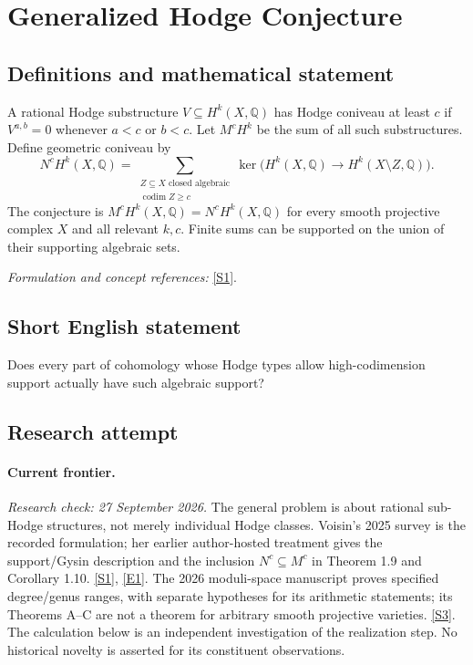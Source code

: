\documentclass[11pt,a4paper]{article}
\newcommand{\Q}{\mathbb{Q}}
\newcommand{\sref}[2]{\hyperlink{source:#1:#2}{[S#2]}}
\newcommand{\eref}[2]{\hyperlink{extra:#1:#2}{[E#2]}}
\newif\ifshowcatalogue
\newcommand{\cataloguescope}[1]{\ifshowcatalogue
 \paragraph{Exact scope in the supplied catalogue.}
 \begin{quote}\small #1\end{quote}\fi}
\begin{document}
\setcounter{section}{0}
\clearpage
\section*{\texorpdfstring{Generalized Hodge Conjecture}{Generalized Hodge Conjecture}}\label{statement}
\subsection{Definitions and mathematical statement}
A rational Hodge substructure $V\subseteq H^k(X,\Q)$ has Hodge coniveau at least $c$ if $V^{a,b}=0$ whenever $a<c$ or $b<c$. Let $M^cH^k$ be the sum of all such substructures. Define geometric coniveau by
\[
 N^cH^k(X,\Q)=\sum_{\substack{Z\subseteq X\text{ closed algebraic}\\ \operatorname{codim}Z\ge c}}
 \ker\bigl(H^k(X,\Q)\to H^k(X\setminus Z,\Q)\bigr).
\]
The conjecture is $M^cH^k(X,\Q)=N^cH^k(X,\Q)$ for every smooth projective complex $X$ and all relevant $k,c$. Finite sums can be supported on the union of their supporting algebraic sets.
\par\smallskip\textit{Formulation and concept references:} \sref{statement}{1}.
\cataloguescope{For every smooth projective complex variety X and integers k,c, prove that the largest rational Hodge substructure of H\textasciicircum{}k(X,Q) with Hodge coniveau at least c equals the subspace of classes that vanish on X minus some closed algebraic subset of codimension at least c.}
\subsection{Short English statement}
Does every part of cohomology whose Hodge types allow high-codimension support actually have such algebraic support?
\subsection{Research attempt}
\paragraph{Current frontier.}
\textit{Research check: 27 September 2026.}
The general problem is about rational sub-Hodge structures, not merely
individual Hodge classes. Voisin's 2025 survey is the recorded formulation;
her earlier author-hosted treatment gives the support/Gysin description and
the inclusion $N^c\subseteq M^c$ in Theorem 1.9 and Corollary 1.10.
\sref{statement}{1}, \eref{statement}{1}.
The 2026 moduli-space manuscript proves specified degree/genus ranges,
with separate hypotheses for its arithmetic statements; its Theorems A--C
are not a theorem for arbitrary smooth projective varieties. \sref{statement}{3}.
The calculation below is an independent investigation of the realization
step. No historical novelty is asserted for its constituent observations.
\end{document}
